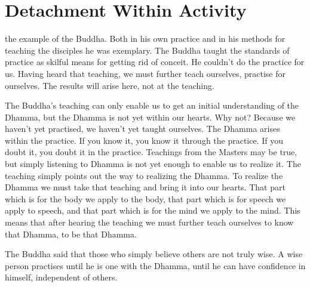 
\renewcommand{\chapterFootnotemark}{\footnotemark}
\renewcommand{\chapterFootnotetext}{\footnotetext{\textit{Note}: This talk has been published elsewhere under the title: `\textit{Samm\={a} Sam\={a}dhi -- Detachment Within Activity}'}}

\chapter{Detachment Within Activity}

 the example of the Buddha. Both in his own practice and in his methods for teaching the disciples he was exemplary. The Buddha taught the standards of practice as skilful means for getting rid of conceit. He couldn't do the practice for us. Having heard that teaching, we must further teach ourselves, practise for ourselves. The results will arise here, not at the teaching. 

The Buddha's teaching can only enable us to get an initial understanding of the Dhamma, but the Dhamma is not yet within our hearts. Why not? Because we haven't yet practised, we haven't yet taught ourselves. The Dhamma arises within the practice. If you know it, you know it through the practice. If you doubt it, you doubt it in the practice. Teachings from the Masters may be true, but simply listening to Dhamma is not yet enough to enable us to realize it. The teaching simply points out the way to realizing the Dhamma. To realize the Dhamma we must take that teaching and bring it into our hearts. That part which is for the body we apply to the body, that part which is for speech we apply to  speech, and that part which is for the mind we apply to the mind. This means that after hearing the teaching we must further teach ourselves to know that Dhamma, to be that Dhamma. 

The Buddha said that those who simply believe others are not truly wise. A wise person practises until he is one with the Dhamma, until he can have confidence in himself, independent of others. 

